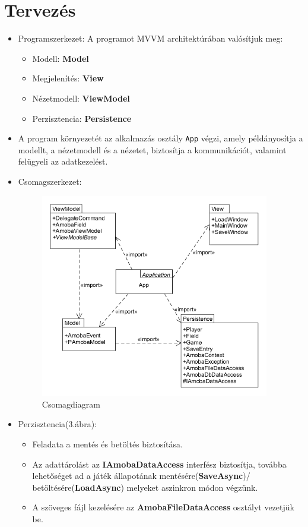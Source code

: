 \documentclass[11pt,a4paper]{article}
\begin{document}
\section{Tervezés}
\begin{itemize}
	\item Programszerkezet: A programot MVVM architektúrában valósítjuk meg:
	\begin{itemize}
		\item Modell: \textbf{Model}
		\item Megjelenítés: \textbf{View}
		\item Nézetmodell: \textbf{ViewModel}
		\item Perzisztencia: \textbf{Persistence}
	\end{itemize}
	\item A program környezetét az alkalmazás osztály \verb|App| végzi, amely példányosítja a
	modellt, a nézetmodell és a nézetet, biztosítja a kommunikációt, valamint felügyeli az
	adatkezelést.
	\item Csomagszerkezet:
	\begin{figure}[h]
		\centering
		\includegraphics[width=10cm]{UMLs/Package.png}
		\caption{Csomagdiagram}
	\end{figure}
	\item Perzisztencia(3.ábra):
	\begin{itemize}
		\item Feladata a mentés és betöltés biztosítása.
		\item Az adattárolást az \textbf{IAmobaDataAccess} interfész biztosítja, továbba
		lehetőséget ad a játék állapotának mentésére(\textbf{SaveAsync})/
		betöltésére(\textbf{LoadAsync})	melyeket aszinkron módon végzünk.
		\item A szöveges fájl kezelésére az \textbf{AmobaFileDataAccess} osztályt vezetjük be.

\end{itemize}
\end{itemize}
\end{document}
